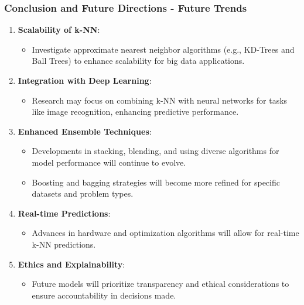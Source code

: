 \documentclass[aspectratio=169]{beamer}
\begin{document}
\begin{frame}[fragile]
    \frametitle{Conclusion and Future Directions - Future Trends}
    \begin{enumerate}
        \item \textbf{Scalability of k-NN}:
            \begin{itemize}
                \item Investigate approximate nearest neighbor algorithms (e.g., KD-Trees and Ball Trees) to enhance scalability for big data applications.
            \end{itemize}
        
        \item \textbf{Integration with Deep Learning}:
            \begin{itemize}
                \item Research may focus on combining k-NN with neural networks for tasks like image recognition, enhancing predictive performance.
            \end{itemize}
        
        \item \textbf{Enhanced Ensemble Techniques}:
            \begin{itemize}
                \item Developments in stacking, blending, and using diverse algorithms for model performance will continue to evolve.
                \item Boosting and bagging strategies will become more refined for specific datasets and problem types.
            \end{itemize}
        
        \item \textbf{Real-time Predictions}:
            \begin{itemize}
                \item Advances in hardware and optimization algorithms will allow for real-time k-NN predictions.
            \end{itemize}
        
        \item \textbf{Ethics and Explainability}:
            \begin{itemize}
                \item Future models will prioritize transparency and ethical considerations to ensure accountability in decisions made.
            \end{itemize}
    \end{enumerate}
\end{frame}
\end{document}
